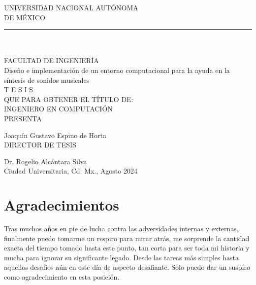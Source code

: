 \documentclass{book}
\begin{document}
	\begin{minipage}{.7\textwidth}
		\begin{flushright}
				\begin{center}
				\begin{center}
					\LARGE{U}\large{NIVERSIDAD} \LARGE{N}\large{ACIONAL} 
					\LARGE{A}\large{UTÓNOMA} \\[10pt]
					\large{DE} 
					\LARGE{M}\large{ÉXICO} 
				\end{center}
				\rule{\textwidth}{2pt}
				\\
				\hrulefill\\[1cm]
				
				\LARGE{F}\large{ACULTAD DE } \LARGE{I}\large{NGENIERÍA}\\[2cm]
				
				\large{Diseño e implementación de un entorno computacional para la ayuda en la síntesis de sonidos musicales}\\[1.5cm]
				
				\huge{T E S I S }\\[1.5cm]
				
				\large{QUE PARA OBTENER EL TÍTULO DE:}\\[1cm]
				
				\large{INGENIERO EN COMPUTACIÓN}\\[1cm]
				
				\large{PRESENTA}
				
				\large{Joaquín Gustavo Espino de Horta}\\[1cm]
				
				\large{DIRECTOR DE TESIS}
				
				\large{Dr. Rogelio Alcántara Silva}\\[1cm]
				
				\large{Ciudad Universitaria, Cd. Mx., Agosto 2024}
				
			\end{center}
		\end{flushright}
	\end{minipage}
	
	\section*{Agradecimientos}
	Tras muchos años en pie de lucha contra las adversidades internas y externas, finalmente puedo tomarme un respiro para mirar atrás, me sorprende la cantidad exacta del tiempo tomado hasta este punto, tan corta para ser toda mi historia y mucha para ignorar su significante legado. Desde las tareas más simples hasta aquellos desafíos aún en este día de aspecto desafiante. Solo puedo dar un suspiro como agradecimiento en esta posición.\par 
	
\end{document}
